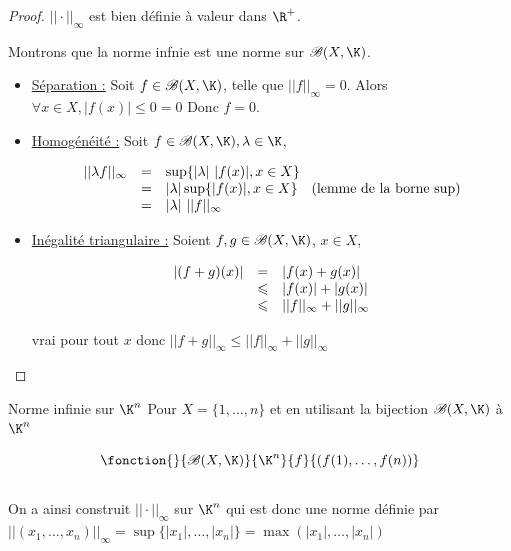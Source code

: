 \begin{proof}
    $|| \cdot ||_\infty$ est bien définie à valeur dans $\R^+$.

    Montrons que la norme infnie est une norme sur $\mathscr B (X, \K)$. 

    \begin{itemize}
        \item \uline{Séparation :}
        Soit $f \in \mathscr B(X, \K)$, telle que $||f ||_\infty = 0$. 
        Alors $\forall x \in X, |f(x)| \leqslant 0 = 0$
        Donc $f = 0$.

        \item \uline{Homogénéité :} Soit $f \in \mathscr B(X, \K), \lambda \in \K$,

        \[
        \begin{array}{rcl}
            || \lambda f ||_\infty & = & \sup\{|\lambda|~|f(x)|, x \in X\} \\
            \space & = & |\lambda| \sup \{ |f(x)| , x \in X\} \quad \text{(lemme de la borne sup)}\\
            \space & = & |\lambda| ~ ||f ||_\infty \\
        \end{array}
        \]

        \item \uline{Inégalité triangulaire :} Soient $f, g \in \mathscr B(X, \K)$, $x \in X$, 

        \[
        \begin{array}{rcl}
            |(f + g)(x)| & = & |f(x) + g(x)| \\
            \space & \leqslant & |f(x)| + |g(x)| \\
            \space & \leqslant & ||f||_\infty + ||g ||_\infty \\
        \end{array}
        \]

        vrai pour tout $x$ donc $|| f + g||_\infty \leqslant ||f||_\infty + ||g||_\infty$
    \end{itemize}
\end{proof}

\begin{definition}{Norme infinie sur $\K^n$}{}
    Pour $X = \{1, \dots, n\}$ et en utilisant la bijection $\mathscr B(X, \K)$
    à $\K^n$ 

    $$\fonction{}{\mathscr B(X, \K)}{\K^n}{f}{(f(1), \dots, f(n))}$$\\

    On a ainsi construit $|| \cdot ||_\infty$ sur $\K^n$ qui est donc une norme définie
    par $||(x_1, \dots, x_n)||_\infty = \sup\{|x_1|, \dots, |x_n| \} = \max (|x_1|, \dots, |x_n|)$
\end{definition}

